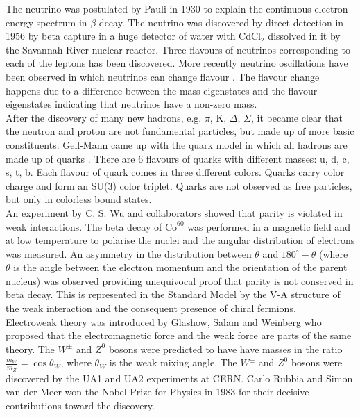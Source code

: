 The neutrino was postulated by Pauli in 1930 \cite{pauli} to explain the 
continuous electron energy spectrum in $\beta$-decay. The neutrino was 
discovered by direct detection in 1956 \cite{neutrino} by beta capture in a 
huge detector of water with CdCl$_{2}$ dissolved in it by the Savannah River 
nuclear reactor. Three flavours of neutrinos corresponding to each of the 
leptons has been discovered. More recently neutrino oscillations have been 
observed in which neutrinos can change flavour \cite{oscillations}. The 
flavour change happens due to a difference between the mass eigenstates and the 
flavour eigenstates indicating that neutrinos have a non-zero mass. \\

After the discovery of many new hadrons, e.g. $\pi$, K, $\Delta$, $\Sigma$, it
became clear that the neutron and proton are not fundamental particles, but made
up of more basic constituents. Gell-Mann came up with the quark model in which 
all hadrons are made up of quarks \cite{gellmann}. There are 6 flavours of 
quarks with different masses: u, d, c, s, t, b. Each flavour of quark comes in 
three different colors. Quarks carry color charge and form an SU(3) color 
triplet. Quarks are not observed as free particles, but only in colorless bound 
states. \\

An experiment by C. S. Wu and collaborators \cite{wu} showed that parity is 
violated in weak interactions. The beta decay of $\mbox{Co}^{60}$ was performed 
in a magnetic field and at low temperature to polarise the nuclei and the 
angular distribution of electrons was measured. An asymmetry in the distribution 
between $\theta$ and $180^{\circ} - \theta$ (where $\theta$ is the angle between 
the electron momentum and the orientation of the parent nucleus) was observed
providing unequivocal proof that parity is not conserved in beta decay. This is
represented in the Standard Model by the V-A structure of the weak interaction
and the consequent presence of chiral fermions. \\

Electroweak theory was introduced by Glashow, Salam and Weinberg \cite{salam} 
who proposed that the electromagnetic force and the weak force are parts of the 
same theory. The $W^{\pm}$ and $Z^{0}$ bosons were predicted to have have masses 
in the ratio $\frac{m_{W}}{m_{Z}} = \cos{\theta_{W}}$, where $\theta_{W}$ is the 
weak mixing angle. The $W^{\pm}$ and $Z^{0}$ bosons were discovered by the UA1 
and UA2 experiments \cite{ua1} at CERN. Carlo Rubbia and Simon van der Meer won 
the Nobel Prize for Physics in 1983 for their decisive contributions toward the 
discovery. \\

